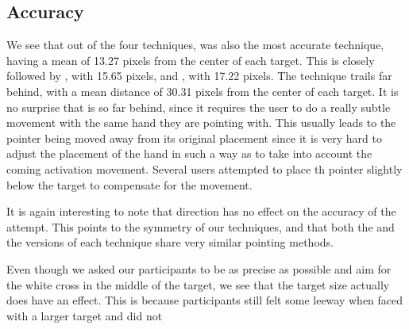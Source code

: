 \subsection{Accuracy}
We see that out of the four techniques, \swipe was also the most accurate technique, having a mean of 13.27 pixels from the center of each target. 
This is closely followed by \throw, with 15.65 pixels, and \grab, with 17.22 pixels.
The \tilt technique trails far behind, with a mean distance of 30.31 pixels from the center of each target.   
It is no surprise that \tilt is so far behind, since it requires the user to do a really subtle movement with the same hand they are pointing with.
This usually leads to the pointer being moved away from its original placement since it is very hard to adjust the placement of the hand in such a way as to take into account the coming activation movement. 
Several users attempted to place th pointer slightly below the target to compensate for the movement. 

It is again interesting to note that direction has no effect on the accuracy of the attempt. 
This points to the symmetry of our techniques, and that both the \pull and the \push versions of each technique share very similar pointing methods.

Even though we asked our participants to be as precise as possible and aim for the white cross in the middle of the target, we see that the target size actually does have an effect.
This is because participants still felt some leeway when faced with a larger target and did not 
